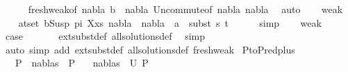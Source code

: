 \begin{isabellebody}
\ \ \ \ \isamarkupfalse%
\ fresh{\isacharunderscore}{\kern0pt}weak{\isacharbrackleft}{\kern0pt}of\ nabla{}\ b\ {\isacharunderscore}{\kern0pt}\ nabla{}{\isacharbrackright}{\kern0pt}\ Un{\isacharunderscore}{\kern0pt}commute{\isacharbrackleft}{\kern0pt}of\ nabla{}\ nabla{}{\isacharbrackright}{\kern0pt}\ \isamarkupfalse%
\ auto\isanewline
\ \ \isamarkupfalse%
\ weak{}{\isacharparenleft}{\kern0pt}{}{\isacharparenright}{\kern0pt}\ \isanewline
\ \ \isamarkupfalse%
\ {\isachardoublequoteopen}{\isasymforall}{\isacharparenleft}{\kern0pt}a{\isacharcomma}{\kern0pt}t{\isacharparenright}{\kern0pt}{\isasymin}set\ {\isacharparenleft}{\kern0pt}{\isacharparenleft}{\kern0pt}b{\isacharcomma}{\kern0pt}Susp\ pi\ X{\isacharparenright}{\kern0pt}{\isacharhash}{\kern0pt}xs{\isacharparenright}{\kern0pt}{\isachardot}{\kern0pt}\ {\isacharparenleft}{\kern0pt}nabla{}\ {\isasymunion}\ nabla{}{\isacharparenright}{\kern0pt}\ {\isasymturnstile}\ a\ {\isasymsharp}\ subst\ s{}\ t{\isachardoublequoteclose}\isanewline
\ \ \ \ \isamarkupfalse%
\ simp\isanewline
\ \ \isamarkupfalse%
\ weak{}\ \isamarkupfalse%
\ {\isacharquery}{\kern0pt}case\ \isanewline
\ \ \ \ \isamarkupfalse%
\ ext{\isacharunderscore}{\kern0pt}subst{\isacharunderscore}{\kern0pt}def\ all{\isacharunderscore}{\kern0pt}solutions{\isacharunderscore}{\kern0pt}def\ \isamarkupfalse%
\ simp\isanewline
{}\isamarkupfalse%
\ {\isacharparenleft}{\kern0pt}auto\ simp\ add{\isacharcolon}{\kern0pt}\ ext{\isacharunderscore}{\kern0pt}subst{\isacharunderscore}{\kern0pt}def\ all{\isacharunderscore}{\kern0pt}solutions{\isacharunderscore}{\kern0pt}def\ fresh{\isacharunderscore}{\kern0pt}weak{\isacharparenright}{\kern0pt}%
\endisatagproof
{\isafoldproof}%
%
\isadelimproof
\isanewline
%
\endisadelimproof
\isanewline
{}\isamarkupfalse%
\ P{}{\isacharunderscore}{\kern0pt}to{\isacharunderscore}{\kern0pt}P{}{\isacharunderscore}{\kern0pt}red{\isacharunderscore}{\kern0pt}plus{}{\isacharcolon}{\kern0pt}\ \isanewline
\ \ \ {\isachardoublequoteopen}P{}\ {\isasymTurnstile}\ {\isacharparenleft}{\kern0pt}nabla{\isacharcomma}{\kern0pt}s{\isacharparenright}{\kern0pt}\ {\isasymRightarrow}\ P{}{\isachardoublequoteclose}\isanewline
\ \ \ {\isachardoublequoteopen}{\isacharparenleft}{\kern0pt}nabla{}{\isacharcomma}{\kern0pt}s{}{\isacharparenright}{\kern0pt}\ {\isasymin}\ U\ P{}{\isachardoublequoteclose}\isanewline

\end{isabellebody}
